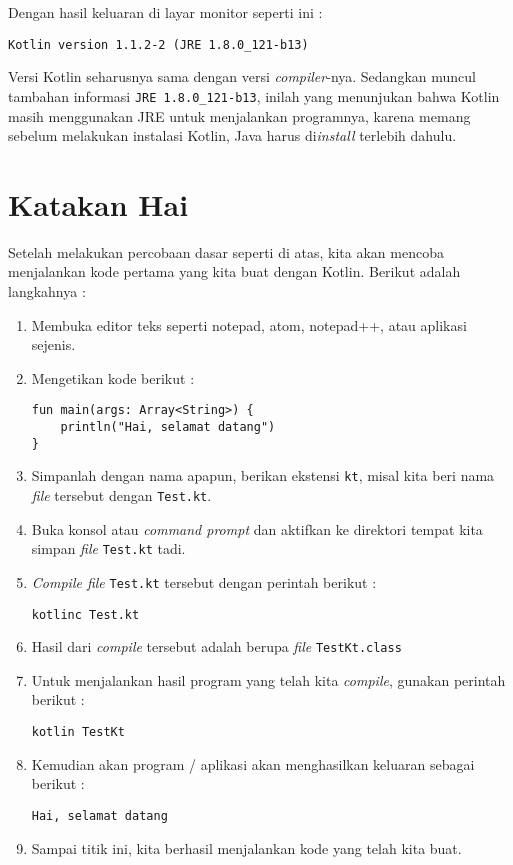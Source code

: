 Dengan hasil keluaran di layar monitor seperti ini :

\begin{lstlisting}
Kotlin version 1.1.2-2 (JRE 1.8.0_121-b13)
\end{lstlisting}

Versi Kotlin seharusnya sama dengan versi \textit{compiler}-nya. Sedangkan muncul tambahan informasi \texttt{JRE 1.8.0\_121-b13}, inilah yang menunjukan bahwa Kotlin masih menggunakan JRE untuk menjalankan programnya, karena memang sebelum melakukan instalasi Kotlin, Java harus di\textit{install} terlebih dahulu.

\section{Katakan Hai}

Setelah melakukan percobaan dasar seperti di atas, kita akan mencoba menjalankan kode pertama yang kita buat dengan Kotlin. Berikut adalah langkahnya :

\begin{enumerate}[1.]
	\item Membuka editor teks seperti notepad, atom, notepad++, atau aplikasi sejenis. 
	\item Mengetikan kode berikut :
	
\begin{lstlisting}
fun main(args: Array<String>) {
    println("Hai, selamat datang")
}
\end{lstlisting}

	\item Simpanlah dengan nama apapun, berikan ekstensi \texttt{kt}, misal kita beri nama \textit{file} tersebut dengan \texttt{Test.kt}.
	\item Buka konsol atau \textit{command prompt} dan aktifkan ke direktori tempat kita simpan \textit{file} \texttt{Test.kt} tadi.
	\item \textit{Compile file} \texttt{Test.kt} tersebut dengan perintah berikut :
	
\begin{lstlisting}
kotlinc Test.kt
\end{lstlisting}

	\item Hasil dari \textit{compile} tersebut adalah berupa \textit{file} \texttt{TestKt.class}
	\item Untuk menjalankan hasil program yang telah kita \textit{compile}, gunakan perintah berikut :
	
\begin{lstlisting}
kotlin TestKt
\end{lstlisting}

	\item Kemudian akan program / aplikasi akan menghasilkan keluaran sebagai berikut :
	
\begin{lstlisting}
Hai, selamat datang
\end{lstlisting}

	\item Sampai titik ini, kita berhasil menjalankan kode yang telah kita buat.
\end{enumerate}

